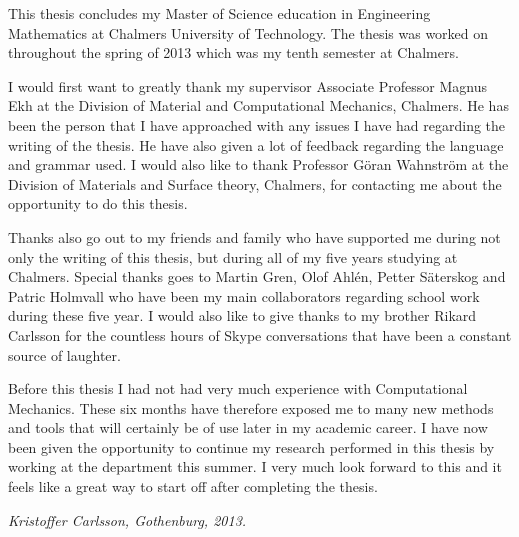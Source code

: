 \documentclass[preface.tex]{subfiles}
\begin{document}
This thesis concludes my Master of Science education in Engineering Mathematics at Chalmers University of Technology. The thesis was worked on throughout the spring of 2013 which was my tenth semester at Chalmers.

I would first want to greatly thank my supervisor Associate Professor Magnus Ekh at the Division of Material and Computational Mechanics, Chalmers. He has been the person that I have approached with any issues I have had regarding the writing of the thesis.  He have also given a lot of feedback regarding the language and grammar used. I would also like to thank Professor Göran Wahnström at the Division of Materials and Surface theory, Chalmers, for contacting me about the opportunity to do this thesis. 

Thanks also go out to my friends and family who have supported me during not only the writing of this thesis, but during all of my five years studying at Chalmers. Special thanks goes to Martin Gren, Olof Ahlén, Petter Säterskog and Patric Holmvall who have been my main collaborators regarding school work during these five year. I would also like to give thanks to my brother Rikard Carlsson for the countless hours of Skype conversations that have been a constant source of laughter.

Before this thesis I had not had very much experience with Computational Mechanics. These six months have therefore exposed me to many new methods and tools that will certainly be of use later in my academic career. I have now been given the opportunity to continue my research performed in this thesis by working at the department this summer. I very much look forward to this and it feels like a great way to start off after completing the thesis.

\textit{Kristoffer Carlsson, Gothenburg, 2013.}
\end{document}
